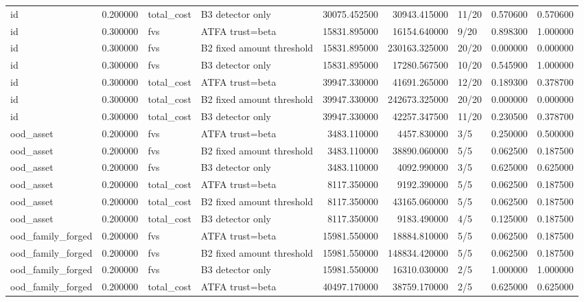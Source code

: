 \begin{tabular}{lrllrrlrr}
id & 0.200000 & total\_cost & B3 detector only & 30075.452500 & 30943.415000 & 11/20 & 0.570600 & 0.570600 \\
id & 0.300000 & fvs & ATFA trust=beta & 15831.895000 & 16154.640000 & 9/20 & 0.898300 & 1.000000 \\
id & 0.300000 & fvs & B2 fixed amount threshold & 15831.895000 & 230163.325000 & 20/20 & 0.000000 & 0.000000 \\
id & 0.300000 & fvs & B3 detector only & 15831.895000 & 17280.567500 & 10/20 & 0.545900 & 1.000000 \\
id & 0.300000 & total\_cost & ATFA trust=beta & 39947.330000 & 41691.265000 & 12/20 & 0.189300 & 0.378700 \\
id & 0.300000 & total\_cost & B2 fixed amount threshold & 39947.330000 & 242673.325000 & 20/20 & 0.000000 & 0.000000 \\
id & 0.300000 & total\_cost & B3 detector only & 39947.330000 & 42257.347500 & 11/20 & 0.230500 & 0.378700 \\
ood\_asset & 0.200000 & fvs & ATFA trust=beta & 3483.110000 & 4457.830000 & 3/5 & 0.250000 & 0.500000 \\
ood\_asset & 0.200000 & fvs & B2 fixed amount threshold & 3483.110000 & 38890.060000 & 5/5 & 0.062500 & 0.187500 \\
ood\_asset & 0.200000 & fvs & B3 detector only & 3483.110000 & 4092.990000 & 3/5 & 0.625000 & 0.625000 \\
ood\_asset & 0.200000 & total\_cost & ATFA trust=beta & 8117.350000 & 9192.390000 & 5/5 & 0.062500 & 0.187500 \\
ood\_asset & 0.200000 & total\_cost & B2 fixed amount threshold & 8117.350000 & 43165.060000 & 5/5 & 0.062500 & 0.187500 \\
ood\_asset & 0.200000 & total\_cost & B3 detector only & 8117.350000 & 9183.490000 & 4/5 & 0.125000 & 0.187500 \\
ood\_family\_forged & 0.200000 & fvs & ATFA trust=beta & 15981.550000 & 18884.810000 & 5/5 & 0.062500 & 0.187500 \\
ood\_family\_forged & 0.200000 & fvs & B2 fixed amount threshold & 15981.550000 & 148834.420000 & 5/5 & 0.062500 & 0.187500 \\
ood\_family\_forged & 0.200000 & fvs & B3 detector only & 15981.550000 & 16310.030000 & 2/5 & 1.000000 & 1.000000 \\
ood\_family\_forged & 0.200000 & total\_cost & ATFA trust=beta & 40497.170000 & 38759.170000 & 2/5 & 0.625000 & 0.625000 \\

\end{tabular}
